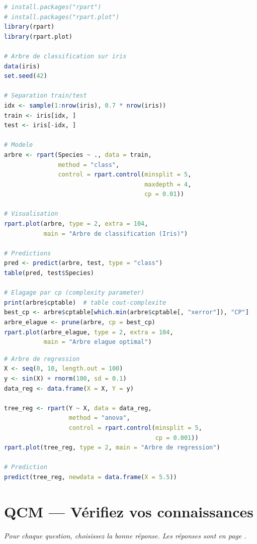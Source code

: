 \documentclass[a4paper,11pt]{article}
\begin{document}
\begin{lstlisting}[language=R, caption=Arbre de classification avec rpart]
# install.packages("rpart")
# install.packages("rpart.plot")
library(rpart)
library(rpart.plot)

# Arbre de classification sur iris
data(iris)
set.seed(42)

# Separation train/test
idx <- sample(1:nrow(iris), 0.7 * nrow(iris))
train <- iris[idx, ]
test <- iris[-idx, ]

# Modele
arbre <- rpart(Species ~ ., data = train,
               method = "class",
               control = rpart.control(minsplit = 5,
                                       maxdepth = 4,
                                       cp = 0.01))

# Visualisation
rpart.plot(arbre, type = 2, extra = 104,
           main = "Arbre de classification (Iris)")

# Predictions
pred <- predict(arbre, test, type = "class")
table(pred, test$Species)

# Elagage par cp (complexity parameter)
print(arbre$cptable)  # table cout-complexite
best_cp <- arbre$cptable[which.min(arbre$cptable[, "xerror"]), "CP"]
arbre_elague <- prune(arbre, cp = best_cp)
rpart.plot(arbre_elague, type = 2, extra = 104,
           main = "Arbre elague optimal")
\end{lstlisting}

\begin{lstlisting}[language=R, caption=Arbre de régression]
# Arbre de regression
X <- seq(0, 10, length.out = 100)
y <- sin(X) + rnorm(100, sd = 0.1)
data_reg <- data.frame(X = X, Y = y)

tree_reg <- rpart(Y ~ X, data = data_reg,
                  method = "anova",
                  control = rpart.control(minsplit = 5,
                                          cp = 0.001))
rpart.plot(tree_reg, type = 2, main = "Arbre de regression")

# Prediction
predict(tree_reg, newdata = data.frame(X = 5.5))
\end{lstlisting}

\newpage
\section*{QCM — Vérifiez vos connaissances}

\medskip
\textit{Pour chaque question, choisissez la bonne réponse. Les réponses sont en page \pageref{reponses-tree}.}
\end{document}
